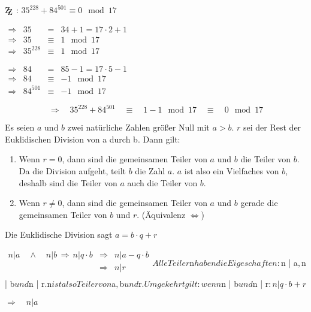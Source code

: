 \documentclass[main.tex]{subfiles}
\begin{document}
\begin{Beispiel}
	$\mathrm{Z\kern-.3em\raise-0.5ex\hbox{Z}}$ : $35^{228} + 84^{501} \equiv 0 \mod 17$

	\begin{minipage}[b]{0.3\linewidth}
		$\begin{array}{rccl}
			\Rightarrow & 35 &=& 34 + 1 = 17 \cdot 2 + 1 \\
			\Rightarrow & 35 &\equiv& 1 \mod 17\\
			\Rightarrow & 35^{228} &\equiv& 1 \mod 17
		\end{array}$
	\end{minipage}
	\hfill \vline \hfill
	\begin{minipage}[b]{0.6\linewidth}
		$\begin{array}{rccl}
			\Rightarrow & 84 &=& 85 - 1 = 17 \cdot 5 - 1 \\
			\Rightarrow & 84 &\equiv& -1 \mod 17 \\
			\Rightarrow & 84^{501} &\equiv& -1 \mod 17
		\end{array}$
	\end{minipage}
	$$\Rightarrow \quad 35^{228} + 84^{501}\quad\equiv\quad 1-1 \mod 17 \quad\equiv\quad 0 \mod 17$$
\end{Beispiel}

\begin{Definition}
	Es seien $a$ und $b$ zwei natürliche Zahlen größer Null mit $a>b$. $r$ sei der Rest der Euklidischen Division von a durch b. Dann gilt:

	\begin{enumerate}
		\item Wenn $r = 0$, dann sind die gemeinsamen Teiler von $a$ und $b$ die Teiler von $b$. Da die Division aufgeht, teilt $b$ die Zahl $a$. $a$ ist also ein Vielfaches von $b$, deshalb sind die Teiler von $a$ auch die Teiler von $b$.
		\item Wenn $r \neq 0$, dann sind die gemeinsamen Teiler von $a$ und $b$ gerade die gemeinsamen Teiler von $b$ und $r$. (Äquivalenz $\Leftrightarrow$)
	\end{enumerate}
\end{Definition}

\begin{Beweis}
	Die Euklidische Division sagt \quad $a = b \cdot q +r$
	
	$\begin{array}{rcl}
		n | a \quad \land \quad n | b \, \Rightarrow \, n | q \cdot b & \Rightarrow & n | a - q\cdot b \\
		& \Rightarrow & n | r \\
	\end{array}
	
	Alle Teiler $n$ haben die Eigeschaften: $n | a$, $n | b$ und $n | r$. $n$ ist also Teiler von $a$, $b$ und $r$.
	
	Umgekehrt gilt: wenn $n | b$ und $n | r$:
	
	$\Rightarrow \quad $n | q \cdot b + r$

	$\Rightarrow \quad $$n | a$
\end{Beweis}
\end{document}

